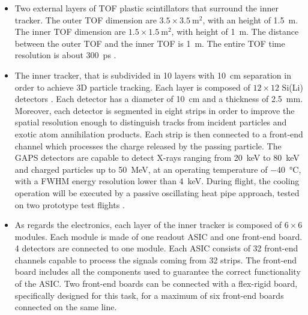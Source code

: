 \begin{itemize}
    \itemsep0em
    \item Two external layers of TOF plastic scintillators that surround the inner tracker. The outer TOF dimension are $3.5 \times \SI{3.5}{\metre\squared}$, with an height of \SI{1.5}{\metre}. The inner TOF dimension are $1.5 \times \SI{1.5}{\metre\squared}$, with height of \SI{1}{\metre}. The distance between the outer TOF and the inner TOF is \SI{1}{\metre}. The entire TOF time resolution is about \SI{300}{\pico\second} \cite{doetinchem_2020_cosmicray}.
    \item The inner tracker, that is subdivided in 10 layers with \SI{10}{\cm} separation in order to achieve 3D particle tracking. Each layer is composed of $12 \times 12$ Si(Li) detectors \cite{spieler_2014_semiconductor}. Each detector has a diameter of \SI{10}{\cm} and a thickness of \SI{2.5}{\mm}. Moreover, each detector is segmented in eight strips in order to improve the spatial resolution enough to distinguish tracks from incident particles and exotic atom annihilation products. Each strip is then connected to a front-end channel which processes the charge released by the passing particle. The GAPS detectors are capable to detect X-rays ranging from \SI{20}{\kilo\electronvolt} to \SI{80}{\kilo\electronvolt} and charged particles up to \SI{50}{\mega\electronvolt}, at an operating temperature of \SI{-40}{\celsius}, with a FWHM energy resolution lower than \SI{4}{\kilo\electronvolt}. During flight, the cooling operation will be executed by a passive oscillating heat pipe approach, tested on two prototype test flights \cite{okazaki_2014_development}.
    \item As regards the electronics, each layer of the inner tracker is composed of $6 \times 6$ modules. Each module is made of one readout ASIC and one front-end board. 4 detectors are connected to one module. Each ASIC consists of 32 front-end channels capable to process the signals coming from 32 strips. The front-end board includes all the components used to guarantee the correct functionality of the ASIC. Two front-end boards can be connected with a flex-rigid board, specifically designed for this task, for a maximum of six front-end boards connected on the same line.
\end{itemize}


